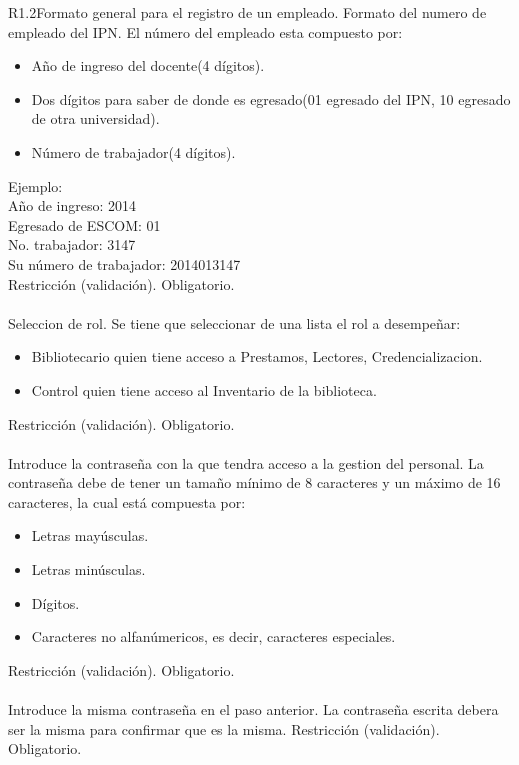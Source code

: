 \begin{BussinesRule}{R1.2}{Formato general para el registro de un empleado.}
	 Formato del numero de empleado del IPN.
	\BRitem[Descripción:] El número del empleado esta compuesto por:
		\begin{itemize} 
			\item Año de ingreso del docente(4 dígitos).
			\item Dos dígitos para saber de donde es egresado(01 egresado del IPN, 10 egresado de otra universidad).
			\item Número de trabajador(4 dígitos).
		\end{itemize}
	Ejemplo:\\
		Año de ingreso: 2014\\
		Egresado de ESCOM: 01\\
		No. trabajador: 3147\\
		Su número de trabajador: 2014013147\\
	\BRitem[Tipo:] Restricción (validación).
	\BRitem[Nivel:] Obligatorio.\\\\

	 Seleccion de rol.
	\BRitem[Descripción:] Se tiene que seleccionar de una lista el rol a desempeñar:
		\begin{itemize} 
			\item Bibliotecario quien tiene acceso a Prestamos, Lectores, Credencializacion.
			\item Control quien tiene acceso al Inventario de la biblioteca.
		\end{itemize}
	\BRitem[Tipo:] Restricción (validación).
	\BRitem[Nivel:] Obligatorio.\\\\

	\BRitem[Contraseña:] Introduce la contraseña con la que tendra acceso a la gestion del personal.
	\BRitem[Descripción:] La contraseña debe de tener un tamaño mínimo de 8 caracteres y un máximo de 16 caracteres, la cual está compuesta por:
		\begin{itemize}	
			\item Letras mayúsculas.
			\item Letras minúsculas.
			\item Dígitos.
			\item Caracteres no alfanúmericos, es decir, caracteres especiales.
		\end{itemize}
	\BRitem[Tipo:] Restricción (validación).
	\BRitem[Nivel:] Obligatorio.\\\\

	 Introduce la misma contraseña en el paso anterior.
	\BRitem[Descripción:] La contraseña escrita debera ser la misma para confirmar que es la misma.
	\BRitem[Tipo:] Restricción (validación).
	\BRitem[Nivel:] Obligatorio.

\end{BussinesRule}

